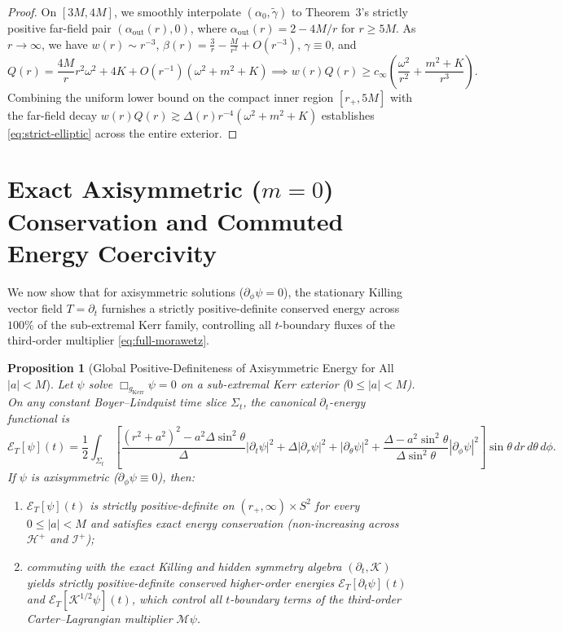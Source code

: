 \documentclass[11pt, a4paper]{article}
\newtheorem{proposition}{Proposition}
\theoremstyle{remark}
\begin{document}
\begin{proof}
On $[3M, 4M]$, we smoothly interpolate $(\alpha_0, \widetilde{\gamma})$ to Theorem~3's strictly positive far-field pair $(\alpha_{\mathrm{out}}(r), 0)$, where $\alpha_{\mathrm{out}}(r) = 2 - 4M/r$ for $r \ge 5M$. As $r \to \infty$, we have $w(r) \sim r^{-3}$, $\beta(r) = \frac{3}{r} - \frac{M}{r^2} + O(r^{-3})$, $\gamma \equiv 0$, and
\begin{equation}
Q(r) = \frac{4M}{r}r^2\omega^2 + 4K + O(r^{-1})(\omega^2 + m^2 + K) \implies w(r)Q(r) \ge c_\infty\left(\frac{\omega^2}{r^2} + \frac{m^2 + K}{r^3}\right).
\end{equation}
Combining the uniform lower bound on the compact inner region $[r_+, 5M]$ with the far-field decay $w(r)Q(r) \gtrsim \Delta(r) r^{-4}(\omega^2 + m^2 + K)$ establishes \eqref{eq:strict-elliptic} across the entire exterior.
\end{proof}

\section{Exact Axisymmetric ($m = 0$) Conservation and Commuted Energy Coercivity}

We now show that for axisymmetric solutions ($\partial_\phi\psi = 0$), the stationary Killing vector field $T = \partial_t$ furnishes a strictly positive-definite conserved energy across $100\%$ of the sub-extremal Kerr family, controlling all $t$-boundary fluxes of the third-order multiplier \eqref{eq:full-morawetz}.

\begin{proposition}[Global Positive-Definiteness of Axisymmetric Energy for All $|a| < M$]
\label{prop:axi-energy}
Let $\psi$ solve $\Box_{g_{\mathrm{Kerr}}}\psi = 0$ on a sub-extremal Kerr exterior ($0 \le |a| < M$). On any constant Boyer--Lindquist time slice $\Sigma_t$, the canonical $\partial_t$-energy functional is
\begin{equation}
\label{eq:energy-T}
\mathcal{E}_T[\psi](t) = \frac{1}{2}\int_{\Sigma_t}\left[\frac{(r^2 + a^2)^2 - a^2\Delta\sin^2\theta}{\Delta}|\partial_t\psi|^2 + \Delta|\partial_r\psi|^2 + |\partial_\theta\psi|^2 + \frac{\Delta - a^2\sin^2\theta}{\Delta\sin^2\theta}|\partial_\phi\psi|^2\right]\sin\theta\,dr\,d\theta\,d\phi.
\end{equation}
If $\psi$ is axisymmetric ($\partial_\phi\psi \equiv 0$), then:
\begin{enumerate}
\item $\mathcal{E}_T[\psi](t)$ is strictly positive-definite on $(r_+, \infty) \times S^2$ for every $0 \le |a| < M$ and satisfies exact energy conservation (non-increasing across $\mathcal{H}^+$ and $\mathcal{I}^+$);
\item commuting with the exact Killing and hidden symmetry algebra $(\partial_t, \mathcal{K})$ yields strictly positive-definite conserved higher-order energies $\mathcal{E}_T[\partial_t\psi](t)$ and $\mathcal{E}_T[\mathcal{K}^{1/2}\psi](t)$, which control all $t$-boundary terms of the third-order Carter--Lagrangian multiplier $\mathcal{M}\psi$.
\end{enumerate}
\end{proposition}
\end{document}
